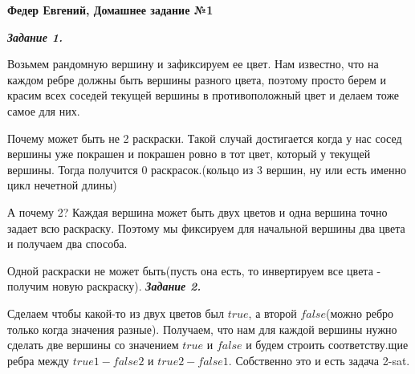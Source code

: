 \documentclass[12pt, a4paper]{scrartcl}
\begin{document}
	\LARGE{\textbf{Федер Евгений, Домашнее задание №1}}\par
	
	\emph{\textbf{Задание 1.}}\par
	
	Возьмем рандомную вершину и зафиксируем ее цвет. Нам известно, что на каждом ребре должны быть вершины разного цвета, поэтому просто берем и красим всех соседей текущей вершины в противоположный цвет и делаем тоже самое для них.\par
	Почему может быть не 2 раскраски. Такой случай достигается когда у нас сосед вершины уже покрашен и покрашен ровно в тот цвет, который у текущей вершины. Тогда получится 0 раскрасок.(кольцо из 3 вершин, ну или есть именно цикл нечетной длины)\par
	А почему 2? Каждая вершина может быть двух цветов и одна вершина точно задает всю раскраску. Поэтому мы фиксируем для начальной вершины два цвета и получаем два способа.\par
	Одной раскраски не может быть(пусть она есть, то инвертируем все цвета - получим новую раскраску).
	\newpage\emph{\textbf{Задание 2.}}\par
	
	Сделаем чтобы какой-то из двух цветов был $true$, а второй $false$(можно ребро только когда значения разные). Получаем, что нам для каждой вершины нужно сделать две вершины со значением $true$ и $false$ и будем строить соответству.щие ребра между $true1-false2$ и $true2-false1$. Собственно это и есть задача 2-sat.
\end{document}
